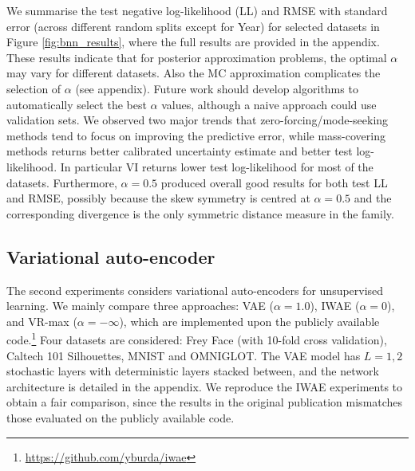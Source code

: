 We summarise the test negative log-likelihood (LL) and RMSE with standard error (across different random splits except for Year) for selected datasets in Figure \ref{fig:bnn_results}, where the full results are provided in the appendix. These results indicate that for posterior approximation problems, the optimal $\alpha$ may vary for different datasets. Also the MC approximation complicates the selection of $\alpha$ (see appendix). Future work should develop algorithms to automatically select the best $\alpha$ values, although a naive approach could use validation sets. We observed two major trends that zero-forcing/mode-seeking methods tend to focus on improving the predictive error, while mass-covering methods returns better calibrated uncertainty estimate and better test log-likelihood. In particular VI returns lower test log-likelihood for most of the datasets. Furthermore, $\alpha = 0.5$ produced overall good results for both test LL and RMSE, possibly because the skew symmetry is centred at $\alpha = 0.5$ and the corresponding divergence is the only symmetric distance measure in the family.

\subsection{Variational auto-encoder}

The second experiments considers variational auto-encoders for unsupervised learning. We mainly compare three approaches: VAE ($\alpha = 1.0$), IWAE ($\alpha = 0$), and VR-max ($\alpha = -\infty$), which are implemented upon the publicly available code.\footnote{\url{https://github.com/yburda/iwae}}
%
Four datasets are considered: Frey Face (with 10-fold cross validation), Caltech 101 Silhouettes, MNIST and OMNIGLOT. The VAE model has $L=1, 2$ stochastic layers with deterministic layers stacked between, and the network architecture is detailed in the appendix. 
%
We reproduce the IWAE experiments to obtain a fair comparison, since the results in the original publication \cite{burda:iwae} mismatches those evaluated on the publicly available code. 

